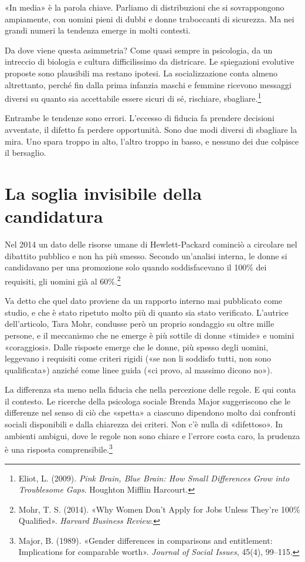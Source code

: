 «In media» è la parola chiave. Parliamo di distribuzioni che si sovrappongono ampiamente, con uomini pieni di dubbi e donne traboccanti di sicurezza. Ma nei grandi numeri la tendenza emerge in molti contesti.

Da dove viene questa asimmetria? Come quasi sempre in psicologia, da un intreccio di biologia e cultura difficilissimo da districare. Le spiegazioni evolutive proposte sono plausibili ma restano ipotesi. La socializzazione conta almeno altrettanto, perché fin dalla prima infanzia maschi e femmine ricevono messaggi diversi su quanto sia accettabile essere sicuri di sé, rischiare, sbagliare.\footnote{Eliot, L. (2009). \textit{Pink Brain, Blue Brain: How Small Differences Grow into Troublesome Gaps}. Houghton Mifflin Harcourt.}

Entrambe le tendenze sono errori. L'eccesso di fiducia fa prendere decisioni avventate, il difetto fa perdere opportunità. Sono due modi diversi di sbagliare la mira. Uno spara troppo in alto, l'altro troppo in basso, e nessuno dei due colpisce il bersaglio.

\section{La soglia invisibile della candidatura}

Nel 2014 un dato delle risorse umane di Hewlett-Packard cominciò a circolare nel dibattito pubblico e non ha più smesso. Secondo un'analisi interna, le donne si candidavano per una promozione solo quando soddisfacevano il 100\% dei requisiti, gli uomini già al 60\%.\footnote{Mohr, T. S. (2014). «Why Women Don't Apply for Jobs Unless They're 100\% Qualified». \textit{Harvard Business Review}.}

Va detto che quel dato proviene da un rapporto interno mai pubblicato come studio, e che è stato ripetuto molto più di quanto sia stato verificato. L'autrice dell'articolo, Tara Mohr, condusse però un proprio sondaggio su oltre mille persone, e il meccanismo che ne emerge è più sottile di donne «timide» e uomini «coraggiosi». Dalle risposte emerge che le donne, più spesso degli uomini, leggevano i requisiti come criteri rigidi («se non li soddisfo tutti, non sono qualificata») anziché come linee guida («ci provo, al massimo dicono no»).

La differenza sta meno nella fiducia che nella percezione delle regole. E qui conta il contesto. Le ricerche della psicologa sociale Brenda Major suggeriscono che le differenze nel senso di ciò che «spetta» a ciascuno dipendono molto dai confronti sociali disponibili e dalla chiarezza dei criteri. Non c'è nulla di «difettoso». In ambienti ambigui, dove le regole non sono chiare e l'errore costa caro, la prudenza è una risposta comprensibile.\footnote{Major, B. (1989). «Gender differences in comparisons and entitlement: Implications for comparable worth». \textit{Journal of Social Issues}, 45(4), 99--115.}

